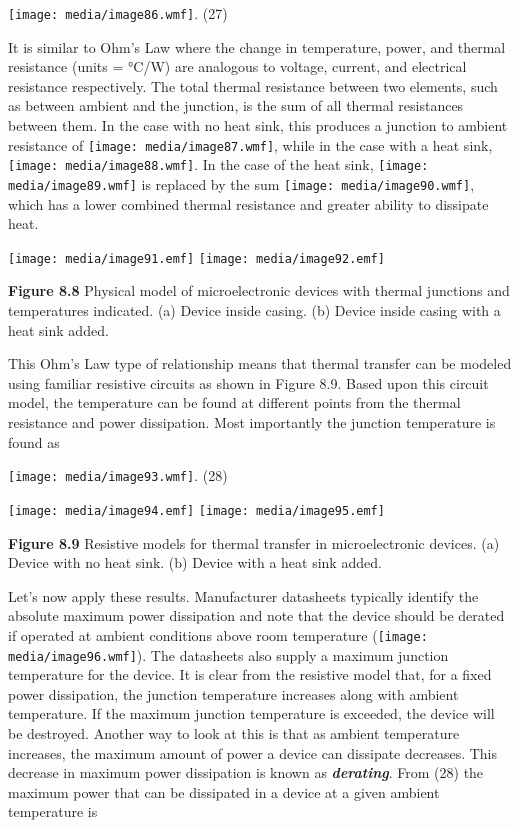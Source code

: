 \texttt{[image: media/image86.wmf]}. (27)

It is similar to Ohm's Law where the change in temperature, power, and
thermal resistance (units = °C/W) are analogous to voltage, current, and
electrical resistance respectively. The total thermal resistance between
two elements, such as between ambient and the junction, is the sum of
all thermal resistances between them. In the case with no heat sink,
this produces a junction to ambient resistance of
\texttt{[image: media/image87.wmf]}, while in the case with a heat sink,
\texttt{[image: media/image88.wmf]}. In the case of the heat sink,
\texttt{[image: media/image89.wmf]} is replaced by the sum
\texttt{[image: media/image90.wmf]}, which has a lower combined thermal
resistance and greater ability to dissipate heat.

\texttt{[image: media/image91.emf]}
\texttt{[image: media/image92.emf]}

\textbf{Figure 8.8} Physical model of microelectronic devices with
thermal junctions and temperatures indicated. (a) Device inside casing.
(b) Device inside casing with a heat sink added.

This Ohm's Law type of relationship means that thermal transfer can be
modeled using familiar resistive circuits as shown in Figure 8.9. Based
upon this circuit model, the temperature can be found at different
points from the thermal resistance and power dissipation. Most
importantly the junction temperature is found as

\texttt{[image: media/image93.wmf]}. (28)

\texttt{[image: media/image94.emf]}
\texttt{[image: media/image95.emf]}

\textbf{Figure 8.9} Resistive models for thermal transfer in
microelectronic devices. (a) Device with no heat sink. (b) Device with a
heat sink added.

Let's now apply these results. Manufacturer datasheets typically
identify the absolute maximum power dissipation and note that the device
should be derated if operated at ambient conditions above room
temperature (\texttt{[image: media/image96.wmf]}). The datasheets also
supply a maximum junction temperature for the device. It is clear from
the resistive model that, for a fixed power dissipation, the junction
temperature increases along with ambient temperature. If the maximum
junction temperature is exceeded, the device will be destroyed. Another
way to look at this is that as ambient temperature increases, the
maximum amount of power a device can dissipate decreases. This decrease
in maximum power dissipation is known as \emph{\textbf{derating}}. From
(28) the maximum power that can be dissipated in a device at a given
ambient temperature is

